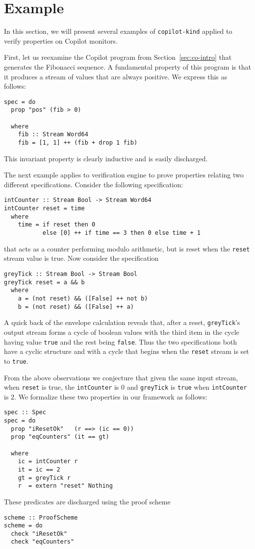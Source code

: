 \section{Example}\label{sec:example}

In this section,  we will present several examples of
\texttt{copilot-kind} applied to verify properties on Copilot
monitors. 


 First, let us reexamine the Copilot program from
 Section~\ref{sec:co-intro} that generates the  Fibonacci
 sequence. A fundamental property of this program is that it produces
 a stream of values that are always positive. We express this as follows:
\begin{lstlisting}[frame=single]
spec = do
  prop "pos" (fib > 0)

  where
    fib :: Stream Word64
    fib = [1, 1] ++ (fib + drop 1 fib)
\end{lstlisting}
This  invariant property is clearly inductive and is easily
discharged. 
 
The next example applies to verification engine to prove properties
relating two different specifications. Consider the following
specification:
\begin{lstlisting}[frame=single]
intCounter :: Stream Bool -> Stream Word64
intCounter reset = time
  where 
    time = if reset then 0
           else [0] ++ if time == 3 then 0 else time + 1
\end{lstlisting}
that acts as a counter performing modulo arithmetic, but is
reset when the \texttt{reset} stream value is true.  Now consider the
specification
\begin{lstlisting}[frame=single]
greyTick :: Stream Bool -> Stream Bool
greyTick reset = a && b
  where
    a = (not reset) && ([False] ++ not b)
    b = (not reset) && ([False] ++ a)
\end{lstlisting}
A quick back of the envelope calculation reveals that,
after a reset, \texttt{greyTick}'s output stream forms a cycle of
boolean values with the third item in the cycle having value
\texttt{true} and the rest being \texttt{false}.  Thus the two
specifications both have a cyclic structure and with a cycle that
begins when the \texttt{reset} stream is set to \texttt{true}.  

From the above observations we 
conjecture that given the same input stream, when \texttt{reset} is
true,  the \texttt{intCounter} is $0$ and \texttt{greyTick} is
\texttt{true} when \texttt{intCounter} is $2.$ We formalize these two
properties in our framework as follows:
\begin{lstlisting}[frame=single]
spec :: Spec
spec = do
  prop "iResetOk"   (r ==> (ic == 0))
  prop "eqCounters" (it == gt)
  
  where
    ic = intCounter r
    it = ic == 2
    gt = greyTick r
    r  = extern "reset" Nothing
\end{lstlisting}
These predicates are discharged using the proof scheme
\begin{lstlisting}[frame=single]
scheme :: ProofScheme
scheme = do
  check "iResetOk"
  check "eqCounters"
\end{lstlisting}  
